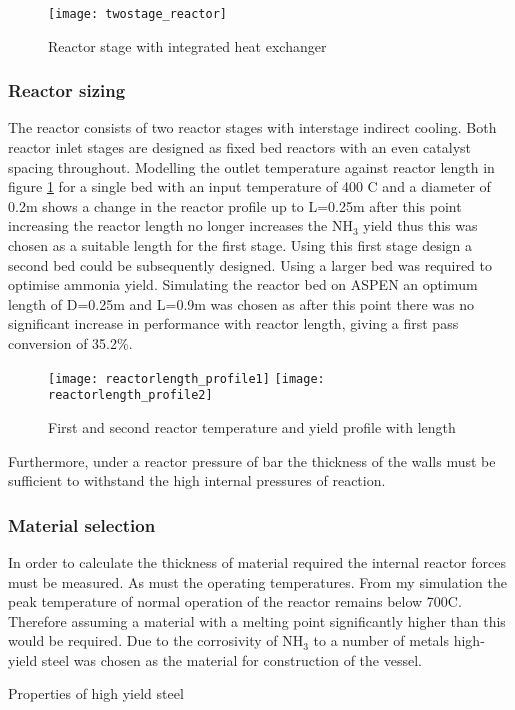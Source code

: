 {{\begin{figure}[!htbp]
		\caption{Reactor stage with integrated heat exchanger}
		
		\centering
		
		\texttt{[image: twostage\_reactor]}
	\end{figure}
}

\subsubsection{Reactor sizing}
The reactor consists of two reactor stages with interstage indirect cooling. Both reactor inlet stages are designed as fixed bed reactors with an even catalyst spacing throughout. Modelling the outlet temperature against reactor length in figure \ref{Rlen} for a single bed with an input temperature of 400 \textdegree C and a diameter of 0.2m shows a change in the reactor profile up to L=0.25m after this point increasing the reactor length no longer increases the NH$_3$ yield thus this was chosen as a suitable length for the first stage. Using this first stage design a second bed could be subsequently designed. Using a larger bed was required to optimise ammonia yield. Simulating the reactor bed on ASPEN an optimum length of D=0.25m and L=0.9m was chosen as after this point there was no significant increase in performance with reactor length, giving a first pass conversion of 35.2\%.\cite{Elnashaie1989}

{\begin{figure}[!htbp]
		\caption{First and second reactor temperature and yield profile with length}
		\label{Rlen}
		\centering
		
		\texttt{[image: reactorlength\_profile1]}
		\texttt{[image: reactorlength\_profile2]}
	\end{figure}
}


Furthermore, under a reactor pressure of \pbar  bar the thickness of the walls must be sufficient to withstand the high internal pressures of reaction.
\subsubsection{Material selection}
In order to calculate the thickness of material required  the internal reactor forces must be measured. As must the operating temperatures. From my simulation the peak temperature of normal operation of the reactor remains below 700\textdegree C. Therefore assuming a material with a melting point significantly higher than this would be required. Due to the corrosivity of NH$_3$ to a number of metals high-yield steel was chosen as the material for construction of the vessel. 
\begin{table}[!htbp]
	\begin{center}
		\label{req}
		\caption{Properties of high yield steel \cite{Howatson1972}}
		

\end{center}
\end{table}}
